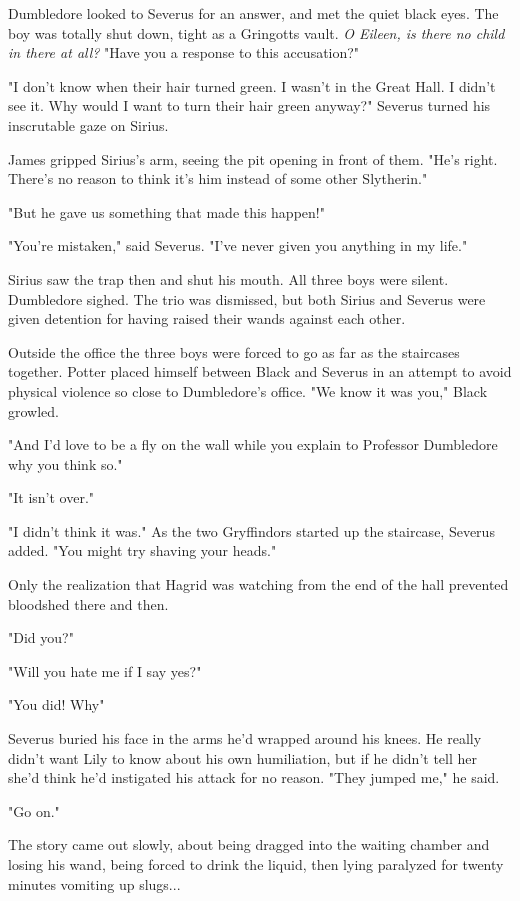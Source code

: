 \documentclass[a4paper,11pt]{article}
\begin{document}
Dumbledore looked to Severus for an answer, and met the quiet black eyes. The boy was totally shut down, tight as a Gringotts vault. \emph{O Eileen, is there no child in there at all?} "Have you a response to this accusation?"

"I don't know when their hair turned green. I wasn't in the Great Hall. I didn't see it. Why would I want to turn their hair green anyway?" Severus turned his inscrutable gaze on Sirius.

James gripped Sirius's arm, seeing the pit opening in front of them. "He's right. There's no reason to think it's him instead of some other Slytherin."

"But he gave us something that made this happen!"

"You're mistaken," said Severus. "I've never given you anything in my life."

Sirius saw the trap then and shut his mouth. All three boys were silent. Dumbledore sighed. The trio was dismissed, but both Sirius and Severus were given detention for having raised their wands against each other.

Outside the office the three boys were forced to go as far as the staircases together. Potter placed himself between Black and Severus in an attempt to avoid physical violence so close to Dumbledore's office. "We know it was you," Black growled.

"And I'd love to be a fly on the wall while you explain to Professor Dumbledore why you think so."

"It isn't over."

"I didn't think it was." As the two Gryffindors started up the staircase, Severus added. "You might try shaving your heads."

Only the realization that Hagrid was watching from the end of the hall prevented bloodshed there and then.

"Did you?"

"Will you hate me if I say yes?"

"You did! Why"

Severus buried his face in the arms he'd wrapped around his knees. He really didn't want Lily to know about his own humiliation, but if he didn't tell her she'd think he'd instigated his attack for no reason. "They jumped me," he said.

"Go on."

The story came out slowly, about being dragged into the waiting chamber and losing his wand, being forced to drink the liquid, then lying paralyzed for twenty minutes vomiting up slugs...
\end{document}
